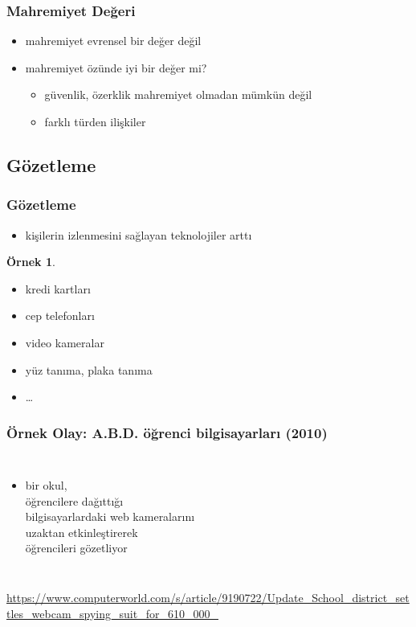 \documentclass[dvipsnames]{beamer}
\theoremstyle{definition}
\theoremstyle{example}
\newtheorem{ornek}[theorem]{Örnek}
\theoremstyle{plain}
\begin{document}
\begin{frame}
  \frametitle{Mahremiyet Değeri}

  \begin{itemize}
    \item mahremiyet evrensel bir değer değil

    \pause
    \medskip
    \item mahremiyet özünde iyi bir değer mi?
    \begin{itemize}
      \item güvenlik, özerklik mahremiyet olmadan mümkün değil
      \item farklı türden ilişkiler
    \end{itemize}
  \end{itemize}
\end{frame}

\subsection{Gözetleme}

\begin{frame}
  \frametitle{Gözetleme}

  \begin{itemize}
    \item kişilerin izlenmesini sağlayan teknolojiler arttı
  \end{itemize}

  \pause
  \begin{ornek}
    \begin{itemize}
      \item kredi kartları
      \item cep telefonları
      \item video kameralar
      \item yüz tanıma, plaka tanıma
      \item \ldots
    \end{itemize}
  \end{ornek}
\end{frame}

\begin{frame}
  \frametitle{Örnek Olay: A.B.D. öğrenci bilgisayarları (2010)}

  \begin{columns}

    \begin{itemize}
      \item bir okul,\\
        öğrencilere dağıttığı\\
        bilgisayarlardaki
        web kameralarını\\
        uzaktan etkinleştirerek\\
        öğrencileri gözetliyor
    \end{itemize}
  \end{columns}

  \medskip
  \tiny{\url{https://www.computerworld.com/s/article/9190722/Update_School_district_settles_webcam_spying_suit_for_610_000_}}
\end{frame}
\end{document}
